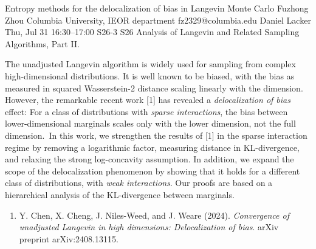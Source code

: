 \begin{talk}
  {Entropy methods for the delocalization of bias in Langevin Monte Carlo}%
  {Fuzhong Zhou}%
  {Columbia University, IEOR department}%
  {fz2329@columbia.edu}%
  {Daniel Lacker}%
  {}%
  {Thu, Jul 31 16:30--17:00}%
  {S26-3}%
  {S26}%
  {Analysis of
   Langevin and Related Sampling Algorithms, Part II.}%
    
   
The unadjusted Langevin algorithm is widely used for sampling from complex high-dimensional distributions. It is well known to be biased, with the bias as measured in squared Wasserstein-2 distance scaling linearly with the dimension. However, the remarkable recent work [1] has revealed a \textit{delocalization of bias} effect: For a class of distributions with \textit{sparse interactions}, the bias between lower-dimensional marginals scales only with the lower dimension, not the full dimension. In this work, we strengthen the results of [1] in the sparse interaction regime by removing a logarithmic factor, measuring distance in KL-divergence, and relaxing the strong log-concavity assumption. In addition, we expand the scope of the delocalization phenomenon by showing that it holds for a different class of distributions, with \textit{weak interactions}. Our proofs are based on a hierarchical analysis of the KL-divergence between marginals.



\medskip



\begin{enumerate}
 \item[{[1]}] Y. Chen, X. Cheng, J. Niles-Weed, and J. Weare (2024). {\it Convergence of unadjusted Langevin in high dimensions: Delocalization of bias}. arXiv preprint arXiv:2408.13115.
\end{enumerate}


\end{talk}

